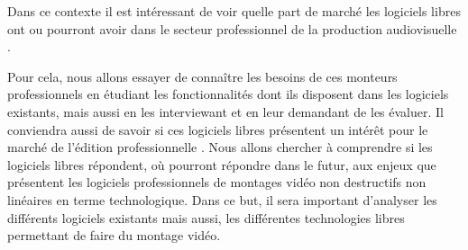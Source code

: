 Dans ce contexte il est intéressant de voir quelle part de marché les
logiciels libres ont ou pourront avoir dans le secteur professionnel de
la production audiovisuelle .

Pour cela, nous allons essayer de connaître les besoins de ces monteurs
professionnels en étudiant les fonctionnalités dont ils disposent
dans les logiciels existants, mais aussi en les interviewant et en
leur demandant de les évaluer.  Il conviendra aussi de savoir si ces
logiciels libres présentent un intérêt pour le marché de l'édition
professionnelle . Nous allons chercher à comprendre si les logiciels
libres répondent, où pourront répondre dans le futur, aux enjeux
que présentent les logiciels professionnels de montages vidéo non
destructifs non linéaires en terme technologique. Dans ce but, il sera
important d'analyser les différents logiciels existants mais aussi, les
différentes technologies libres permettant de faire du montage vidéo.
